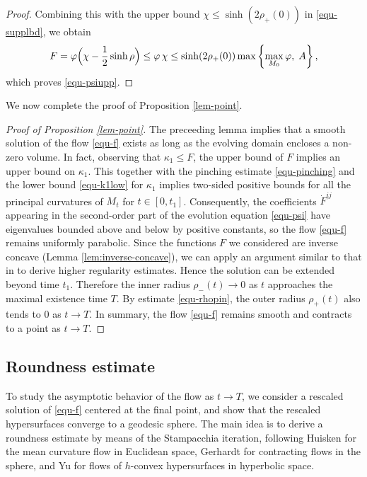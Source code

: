 \documentclass[11pt,reqno]{amsart}
\theoremstyle{remark}
\numberwithin{equation}{section}
\begin{document}
\begin{proof}
Combining this with the upper bound $\chi\le \sinh(2\rho_+(0))$ in \eqref{equ-supplbd}, we obtain
\[
F=\varphi\Bigl(\chi-\frac12\sinh\rho\Bigr)
\le \varphi\,\chi
\le \sinh(2\rho_+(0))
\max\left\{\max_{M_0}\varphi,\;A\right\},
\]
which proves \eqref{equ-psiupp}.
\end{proof}

We now complete the proof of Proposition \ref{lem-point}.
\begin{proof}[Proof of Proposition \ref{lem-point}]
The preceeding lemma implies that a smooth solution of the flow \eqref{equ-f} exists as long as the evolving domain encloses a non-zero volume. In fact, observing that $\kappa_1\leq F$, the upper bound of $F$ implies an upper bound on $\kappa_1$. This together with the pinching estimate \eqref{equ-pinching} and the lower bound \eqref{equ-k1low} for $\kappa_1$ implies  two-sided positive bounds for all the principal curvatures of $M_t$ for $t\in [0,t_1]$. Consequently, the coefficients $\dot{F}^{ij}$ appearing in the second-order part of the evolution equation \eqref{equ-psi} have eigenvalues bounded above and below by positive constants, so the flow \eqref{equ-f} remains uniformly parabolic. %
	Since the functions $F$ we considered are inverse concave (Lemma \ref{lem:inverse-concave}), we can apply an argument similar to that in \cite[Section 5]{AW18} to derive higher regularity estimates. Hence the solution can be extended beyond time $t_1$.  Therefore the inner radius $\rho_-(t)\to 0$ as $t$ approaches the maximal existence time $T$. By estimate \eqref{equ-rhopin}, the outer radius $\rho_+(t)$ also tends to 0 as $t\to T$. In summary, the flow \eqref{equ-f} remains smooth and contracts to a point as $t\to T$.
\end{proof}


\subsection{Roundness estimate}\label{sec6}
To study the asymptotic behavior of the flow as $t\to T$, we consider a rescaled solution of \eqref{equ-f} centered at the final point, and show that the rescaled hypersurfaces converge to a geodesic sphere. The main idea is to derive a roundness estimate by means of the Stampacchia iteration, following Huisken \cite{Hui86} for the mean curvature flow in Euclidean space, Gerhardt \cite{Ger15} for contracting flows in the sphere, and Yu \cite{Yu16} for flows of $h$-convex hypersurfaces in hyperbolic space.
\end{document}
